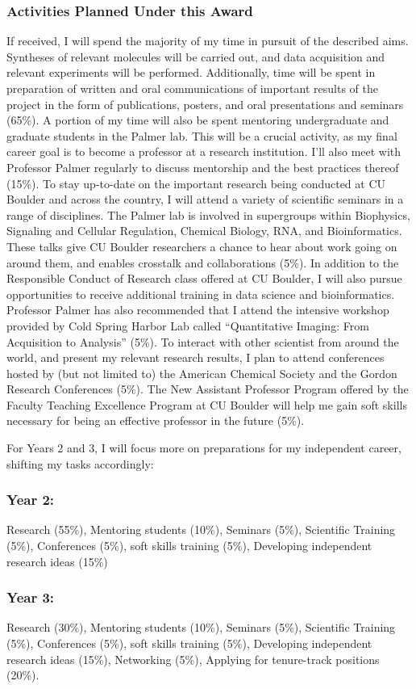 \documentclass{F32}
\begin{document}
\subsubsection*{Activities Planned Under this Award}
If received, I will spend the majority of my time in pursuit of the described aims. Syntheses of relevant molecules will be carried out, and data acquisition and relevant experiments will be performed. Additionally, time will be spent in preparation of written and oral communications of important results of the project in the form of publications, posters, and oral presentations and seminars (65\%).
A portion of my time will also be spent mentoring undergraduate and graduate students in the Palmer lab. This will be a crucial activity, as my final career goal is to become a professor at a research institution. I'll also meet with Professor Palmer regularly to discuss mentorship and the best practices thereof (15\%).
To stay up-to-date on the important research being conducted at CU Boulder and across the country, I will attend a variety of scientific seminars in a range of disciplines. The Palmer lab is involved in supergroups within Biophysics, Signaling and Cellular Regulation, Chemical Biology, RNA, and Bioinformatics. These talks give CU Boulder researchers a chance to hear about work going on around them, and enables crosstalk and collaborations (5\%).
In addition to the Responsible Conduct of Research class offered at CU Boulder, I will also pursue opportunities to receive additional training in data science and bioinformatics. Professor Palmer has also recommended that I attend the intensive workshop provided by Cold Spring Harbor Lab called ``Quantitative Imaging: From Acquisition to Analysis'' (5\%).
To interact with other scientist from around the world, and present my relevant research results, I plan to attend conferences hosted by (but not limited to) the American Chemical Society and the Gordon Research Conferences (5\%).
The New Assistant Professor Program offered by the Faculty Teaching Excellence Program at CU Boulder will help me gain soft skills necessary for being an effective professor in the future (5\%).

For Years 2 and 3, I will focus more on preparations for my independent career, shifting my tasks accordingly:

\subsubsection*{Year 2:}
Research (55\%), Mentoring students (10\%), Seminars (5\%), Scientific Training (5\%), Conferences (5\%), soft skills training (5\%), Developing independent research ideas (15\%)

\subsubsection*{Year 3:}
Research (30\%), Mentoring students (10\%), Seminars (5\%), Scientific Training (5\%), Conferences (5\%), soft skills training (5\%), Developing independent research ideas (15\%), Networking (5\%), Applying for tenure-track positions (20\%).
\end{document}
